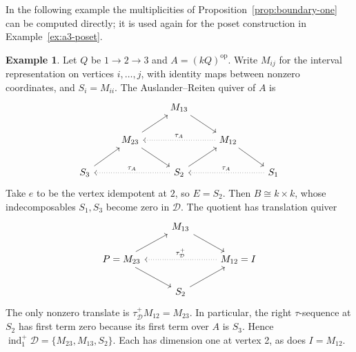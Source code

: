 \documentclass[a4paper,reqno,10pt]{amsart}
\theoremstyle{definition}
\newtheorem{example}[theorem]{Example}
\numberwithin{equation}{section}
\DeclareMathOperator{\ind}{ind}
\newcommand{\op}{\mathrm{op}}
\newcommand{\cD}{\mathcal D}
\begin{document}
In the following example the multiplicities of
Proposition~\ref{prop:boundary-one} can be computed directly; it is used
again for the poset construction in Example~\ref{ex:a3-poset}.
\begin{example}\label{ex:a3}
Let \(Q\) be \(1\to2\to3\) and \(A=(kQ)^\op\). Write
\(M_{ij}\) for the interval representation on vertices \(i,\ldots,j\),
with identity maps between nonzero coordinates, and \(S_i=M_{ii}\).
The Auslander--Reiten quiver of \(A\) is
\[
\begin{tikzcd}
 &&M_{13}\arrow[dr]&&\\
 &M_{23}\arrow[ur]\arrow[dr]&&M_{12}\arrow[dr]
   \arrow[ll,dotted,"\tau_A"']&\\
 S_3\arrow[ur]&&S_2\arrow[ur]\arrow[ll,dotted,"\tau_A"']&&
 S_1\arrow[ll,dotted,"\tau_A"']
\end{tikzcd}
\]
Take \(e\) to be the vertex idempotent at \(2\), so \(E=S_2\).
Then \(B\cong k\times k\), whose indecomposables
\(S_1,S_3\) become zero in \(\cD\). The quotient has translation quiver
\[
\begin{tikzcd}
 &M_{13}\arrow[dr]&\\
 P=M_{23}\arrow[ur]\arrow[dr]&&M_{12}=I\arrow[ll,dotted,"\tau_{\cD}^+"']\\
 &S_2\arrow[ur]&
\end{tikzcd}
\]
The only nonzero translate is \(\tau_{\cD}^+M_{12}=M_{23}\). In particular,
the right \(\tau\)-sequence at \(S_2\) has first term zero because its
first term over \(A\) is \(S_3\). Hence
\(\ind_1^+\cD=\{M_{23},M_{13},S_2\}\). Each has dimension one at
vertex 2, as does \(I=M_{12}\).
\end{example}
\end{document}

